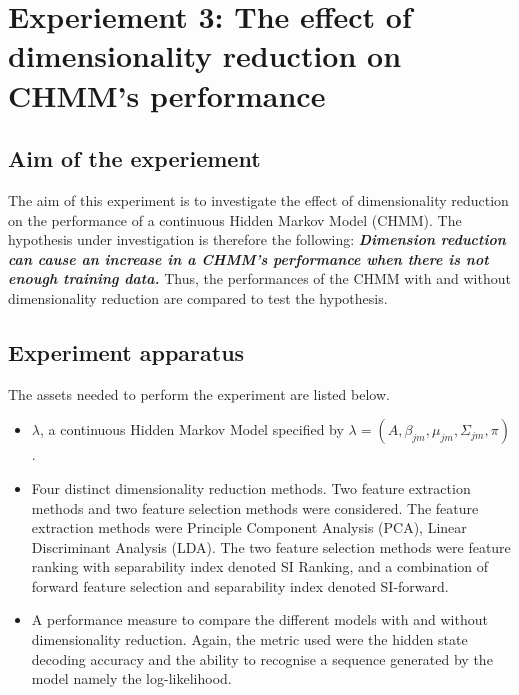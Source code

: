 \newpage
\section{Experiement 3: The effect of dimensionality reduction on CHMM's performance}  \label{exp:dim}

\subsection{Aim of the experiement}
The aim of this experiment is to investigate the effect of dimensionality reduction on the performance of a continuous Hidden Markov Model (CHMM).
The hypothesis under investigation is therefore the following:
\textbf{\textit{Dimension reduction can cause an increase in a CHMM's performance when there is not enough training data.}}
Thus, the performances of the CHMM with and without dimensionality reduction are compared to test the hypothesis.

\subsection{Experiment apparatus}
The assets needed to perform the experiment are listed below.
\begin{itemize}
	\item \(\lambda\), a continuous Hidden Markov Model specified by \(\lambda = (A, \beta_{jm}, \mu_{jm}, \Sigma_{jm}, \pi)\).
	\item Four distinct dimensionality reduction methods. Two feature extraction methods and two feature selection methods were considered. The feature extraction methods were Principle Component Analysis (PCA), Linear Discriminant Analysis (LDA). The two feature selection methods were feature ranking with separability index denoted SI Ranking, and a combination of forward feature selection and separability index denoted SI-forward.
	\item A performance measure to compare the different models with and without dimensionality reduction. Again, the metric used were the hidden state decoding accuracy and the ability to recognise a sequence generated by the model namely the log-likelihood.
\end{itemize}

